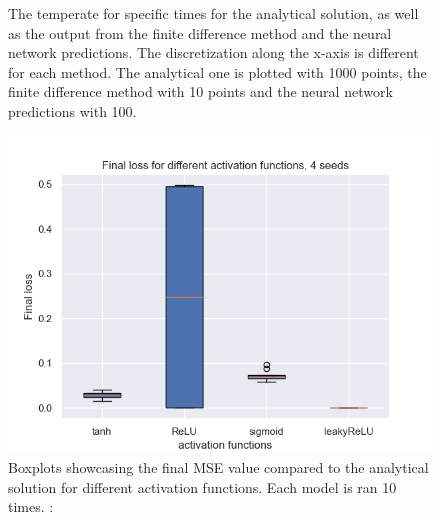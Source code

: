 \begin{figure}[h!]
    \caption{The temperate for specific times for the analytical solution, as well as the output from the finite difference method and the neural network predictions. The discretization along the x-axis is different for each method. The analytical one is plotted with 1000 points, the finite difference method with 10 points and the neural network predictions with 100. 
    }
    \label{fig:timeslices}
\end{figure}



\begin{figure}[h!]
    \centering
    \includegraphics[width=1.0\linewidth]{project_3/plots/activation_search.png}
    \caption{Boxplots showcasing the final MSE value compared to the analytical solution for different activation functions. Each model is ran 10 times. : }
    \label{fig:boxplots_activations}
\end{figure}

